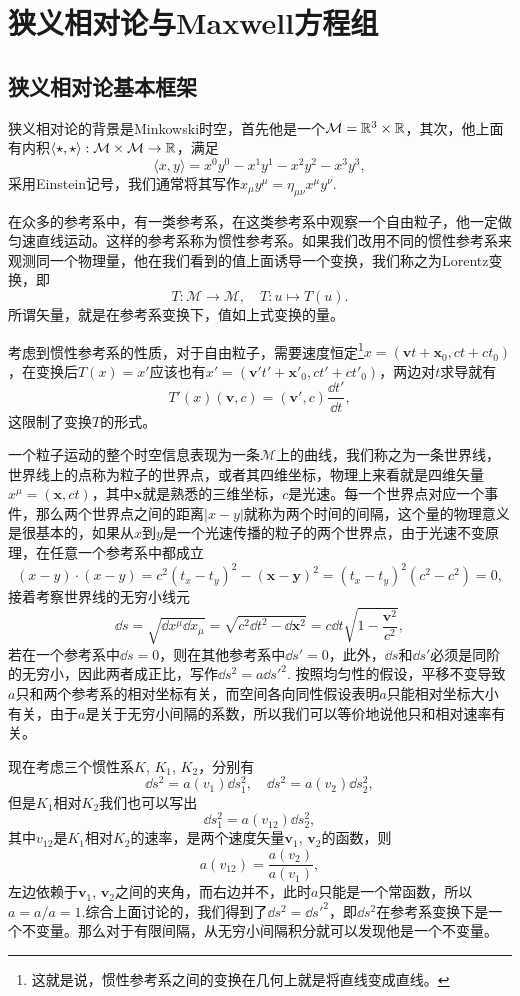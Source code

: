 \documentclass[10pt]{book}
\begin{document}
\mainmatter
\chapter{狭义相对论与Maxwell方程组}
\section{狭义相对论基本框架}
狭义相对论的背景是Minkowski时空，首先他是一个$\mathcal{M}=\mathbb{R}^{3}\times \mathbb{R}$，其次，他上面有内积$\langle\star,\star\rangle:\mathcal{M}\times \mathcal{M}\to \mathbb{R}$，满足
\[
	\langle x,y\rangle=x^0y^0-x^1y^1-x^2y^2-x^3y^3,
\]
采用Einstein记号，我们通常将其写作$x_\mu y^\mu=\eta_{\mu\nu}x^\mu y^\nu$.

在众多的参考系中，有一类参考系，在这类参考系中观察一个自由粒子，他一定做匀速直线运动。这样的参考系称为惯性参考系。如果我们改用不同的惯性参考系来观测同一个物理量，他在我们看到的值上面诱导一个变换，我们称之为Lorentz变换，即
\[
	T:\mathcal{M}\to \mathcal{M},\quad T:u\mapsto T(u).
\]
所谓矢量，就是在参考系变换下，值如上式变换的量。

考虑到惯性参考系的性质，对于自由粒子，需要速度恒定\footnote{这就是说，惯性参考系之间的变换在几何上就是将直线变成直线。}$x=(\bm{v}t+\bm{x}_0,ct+ct_0)$，在变换后$T(x)=x'$应该也有$x'=(\bm{v}'t'+\bm{x}'_0,ct'+ct'_0)$，两边对$t$求导就有
\begin{equation}
	T'(x)(\bm{v},c)=(\bm{v}',c)\frac{\dd t'}{\dd t},
	\label{1}
\end{equation}
这限制了变换$T$的形式。

一个粒子运动的整个时空信息表现为一条$\mathcal{M}$上的曲线，我们称之为一条世界线，世界线上的点称为粒子的世界点，或者其四维坐标，物理上来看就是四维矢量$x^\mu=(\bm{x},ct)$，其中$\bm{x}$就是熟悉的三维坐标，$c$是光速。每一个世界点对应一个事件，那么两个世界点之间的距离$|x-y|$就称为两个时间的间隔，这个量的物理意义是很基本的，如果从$x$到$y$是一个光速传播的粒子的两个世界点，由于光速不变原理，在任意一个参考系中都成立
\[
	(x-y)\cdot (x-y)=c^2(t_x-t_y)^2-(\bm{x-y})^2=(t_x-t_y)^2(c^2-c^2)=0,
\]
接着考察世界线的无穷小线元
\[
	\dd s=\sqrt{\dd x^\mu\dd x_\mu}=\sqrt{c^2\dd t^2-\dd \bm{x}^2}=c\dd t \sqrt{1-\frac{\bm{v}^2}{c^2}},
\]
若在一个参考系中$\dd s=0$，则在其他参考系中$\dd s'=0$，此外，$\dd s$和$\dd s'$必须是同阶的无穷小，因此两者成正比，写作$\dd s^2=a\dd s'^2$.
按照均匀性的假设，平移不变导致$a$只和两个参考系的相对坐标有关，而空间各向同性假设表明$a$只能相对坐标大小有关，由于$a$是关于无穷小间隔的系数，所以我们可以等价地说他只和相对速率有关。

现在考虑三个惯性系$K$, $K_1$, $K_2$，分别有
\[
	\dd s^2=a(v_1)\dd s_1^2,\quad \dd s^2=a(v_2)\dd s_2^2,
\]
但是$K_1$相对$K_2$我们也可以写出
\[
	\dd s_1^2=a(v_{12})\dd s_2^2,
\]
其中$v_{12}$是$K_1$相对$K_2$的速率，是两个速度矢量$\bm{v}_1$, $\bm{v}_2$的函数，则
\[
	a(v_{12})=\frac{a(v_2)}{a(v_1)},
\]
左边依赖于$\bm{v}_1$, $\bm{v}_2$之间的夹角，而右边并不，此时$a$只能是一个常函数，所以$a=a/a=1$.综合上面讨论的，我们得到了$\dd s^2=\dd s'^2$，即$\dd s^2$在参考系变换下是一个不变量。那么对于有限间隔，从无穷小间隔积分就可以发现他是一个不变量。
\end{document}
